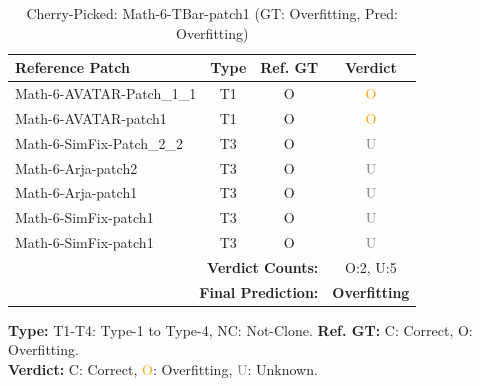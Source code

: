 \begin{table}[t]
\centering
\caption{Cherry-Picked: Math-6-TBar-patch1 (GT: Overfitting, Pred: Overfitting)}
\label{tab:cherry-Math6TBarpatch1}
\footnotesize
\renewcommand{\arraystretch}{1.1}
\setlength{\tabcolsep}{4pt}
\begin{tabular}{l|c|c|c}
\hline
\textbf{Reference Patch} & \textbf{Type} & \textbf{Ref. GT} & \textbf{Verdict} \\
\hline
Math-6-AVATAR-Patch\_1\_1 & T1 & O & \textcolor{orange}{O} \\
Math-6-AVATAR-patch1 & T1 & O & \textcolor{orange}{O} \\
Math-6-SimFix-Patch\_2\_2 & T3 & O & \textcolor{gray}{U} \\
Math-6-Arja-patch2 & T3 & O & \textcolor{gray}{U} \\
Math-6-Arja-patch1 & T3 & O & \textcolor{gray}{U} \\
Math-6-SimFix-patch1 & T3 & O & \textcolor{gray}{U} \\
Math-6-SimFix-patch1 & T3 & O & \textcolor{gray}{U} \\
\hline
\multicolumn{3}{r|}{\textbf{Verdict Counts:}} & O:2, U:5 \\
\multicolumn{3}{r|}{\textbf{Final Prediction:}} & \textbf{Overfitting} \\
\hline
\end{tabular}
\vspace{1mm}
\parbox{\linewidth}{\centering\footnotesize 
\vspace{1mm}
\textbf{Type:} T1-T4: Type-1 to Type-4, NC: Not-Clone. \;
\textbf{Ref. GT:} C: Correct, O: Overfitting. \\
\textbf{Verdict:} \textcolor{green!60!black}{C}: Correct, \textcolor{orange}{O}: Overfitting, \textcolor{gray}{U}: Unknown.}
\end{table}


